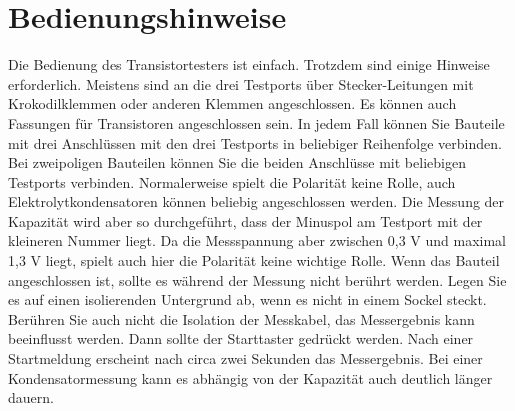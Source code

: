 \chapter{Bedienungshinweise}
\label{sec:manual}
Die Bedienung des Transistortesters ist einfach.
Trotzdem sind einige Hinweise erforderlich.
Meistens sind an die drei Testports über Stecker-Leitungen mit Krokodilklemmen oder anderen Klemmen angeschlossen.
Es können auch Fassungen für Transistoren angeschlossen sein.
In jedem Fall können Sie Bauteile mit drei Anschlüssen mit den drei Testports in beliebiger Reihenfolge verbinden.
Bei zweipoligen Bauteilen können Sie die beiden Anschlüsse mit beliebigen Testports verbinden.
Normalerweise spielt die Polarität keine Rolle, auch Elektrolytkondensatoren können beliebig angeschlossen werden.
Die Messung der Kapazität wird aber so durchgeführt, dass der Minuspol am Testport mit der kleineren Nummer liegt.
Da die Messspannung aber zwischen 0,3 V und maximal 1,3 V liegt, spielt auch hier die Polarität keine wichtige Rolle.
Wenn das Bauteil angeschlossen ist, sollte es während der Messung nicht berührt werden. Legen Sie es auf einen
isolierenden Untergrund ab, wenn es nicht in einem Sockel steckt. Berühren Sie auch nicht die Isolation der Messkabel,
das Messergebnis kann beeinflusst werden.
Dann sollte der Starttaster gedrückt werden.
Nach einer Startmeldung erscheint nach circa zwei Sekunden das Messergebnis. Bei einer Kondensatormessung kann es
abhängig von der Kapazität auch deutlich länger dauern.

